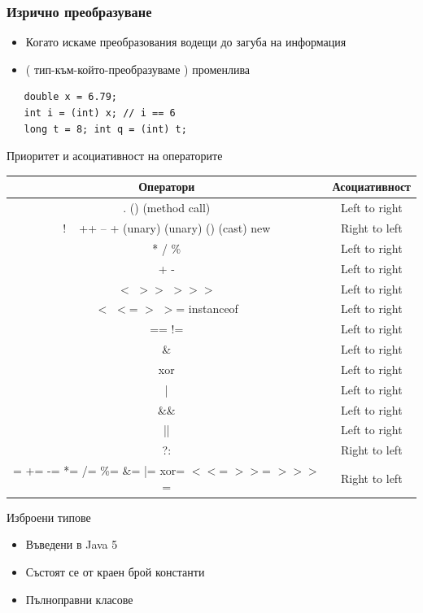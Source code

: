 \documentclass{beamer}
\begin{document}
\begin{frame}[fragile]
  \frametitle{Изрично преобразуване}
  \transdissolve
  \begin{itemize}
  \item Когато искаме преобразования водещи
    до загуба на информация
  \item ( тип-към-който-преобразуваме ) променлива
  \end{itemize}
  \begin{lstlisting}
   double x = 6.79;
   int i = (int) x; // i == 6
   long t = 8; int q = (int) t;
  \end{lstlisting}
\end{frame}

\begin{frame}{Приоритет и асоциативност на операторите}
  \transdissolve
\small
\begin{tabular}{|c|c|}
  \hline
  Оператори & Асоциативност \\
  \hline
  [] . () (method call) & Left to right \\
  \hline
  ! ~ ++ -- + (unary) (unary) () (cast) new & Right to left \\
  \hline
  * / \% & Left to right \\
  \hline
  + -   & Left to right \\
  \hline
  $<$ $>$$>$ $>$$>$$>$ & Left to right \\
  \hline
  $<$ $<$= $>$ $>$= instanceof & Left to right \\
  \hline
  == != & Left to right \\
  \hline
  \& & Left to right \\
  \hline
  xor & Left to right \\
  \hline
  |                                      & Left to right \\
  \hline
  \&\&                                   &  Left to right \\
  \hline
  ||                                   &  Left to right \\
  \hline
  ?:                                  &   Right to left \\
  \hline
  = += -= *= /= \%= \&= |= xor= $<$$<$= $>$$>$= $>$$>$$>$= & Right to left \\
  \hline
\end{tabular}

\end{frame}

\begin{frame}{Изброени типове}
  \transdissolve
  \begin{itemize}
  \item Въведени в Java 5
  \item Състоят се от краен брой константи
  \item Пълноправни класове 
  \end{itemize}
\end{frame}
\end{document}
